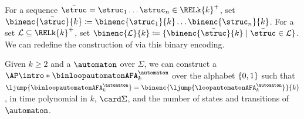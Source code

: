 \documentclass[a4paper,UKenglish,cleveref, autoref, thm-restate]{lipics-v2021}
\DeclarePairedDelimiter\set{\{}{\}}
\newcommand{\defeq}{\coloneq}
\newcommand{\mul}[1]{\bar{#1}}
\newcommand{\vsig}{\Sigma}
\begin{document}
For a sequence $\mul{\struc} = \struc_1 \dots \struc_n \in \RELk{k}^{+}$,
set $\binenc{\mul{\struc}}{k} \defeq \binenc{\struc_1}{k} \dots \binenc{\struc_n}{k}$.
For a set $\mathcal{L} \subseteq \RELk{k}^{+}$,
set $\binenc{\mathcal{L}}{k} \defeq \set{\binenc{\mul{\struc}}{k} \mid \mul{\struc} \in \mathcal{L}}$.
We can redefine the construction of  via this binary encoding.
\begin{lemma}\label{lemma: to binary AFA}
    Given $k \ge 2$ and a  $\automaton$ over $\vsig$,
    we can construct a  $\AP\intro*\binloopautomatonAFA_{k}^{\automaton}$ over the alphabet $\set{0,1}$
    such that $\ljump{\binloopautomatonAFA_{k}^{\automaton}} = \binenc{\ljump{\loopautomatonAFA_{k}^{\automaton}}}{k}$,
    in time polynomial in $k$, $\card\vsig$, and the number of states and transitions of $\automaton$.
\end{lemma}
\end{document}
